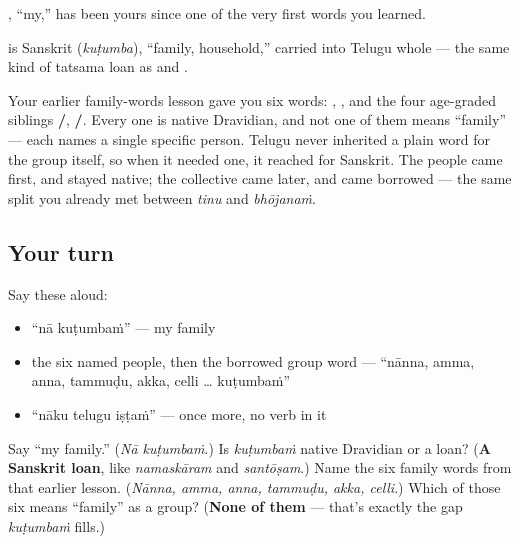 \textbf{}, \textquotedblleft{}my,\textquotedblright{} has been yours since one of the very first words you learned.

\begin{cousinweb}
\textbf{} is Sanskrit \textbf{} (\emph{kuṭumba}), \textquotedblleft{}family, household,\textquotedblright{} carried into Telugu whole — the same kind of tatsama loan as \textbf{} and \textbf{}.

Your earlier family-words lesson gave you six words: \textbf{}, \textbf{}, and the four age-graded siblings \textbf{/}, \textbf{/}. Every one is native Dravidian, and not one of them means \textquotedblleft{}family\textquotedblright{} — each names a single specific person. Telugu never inherited a plain word for the group itself, so when it needed one, it reached for Sanskrit. The people came first, and stayed native; the collective came later, and came borrowed — the same split you already met between \emph{tinu} and \emph{bhōjanaṁ}.
\end{cousinweb}

\subsection*{Your turn}
Say these aloud:

\begin{itemize}
\raggedright
  \item \textquotedblleft{}nā kuṭumbaṁ\textquotedblright{} — my family
  \item the six named people, then the borrowed group word — \textquotedblleft{}nānna, amma, anna, tammuḍu, akka, celli … kuṭumbaṁ\textquotedblright{}
  \item \textquotedblleft{}nāku telugu iṣṭaṁ\textquotedblright{} — once more, no verb in it
\end{itemize}

\begin{tcolorbox}[breakable,colback=teal!4,colframe=teal!35!black,title={Before you move on}]
Say \textquotedblleft{}my family.\textquotedblright{} (\emph{Nā kuṭumbaṁ}.) Is \emph{kuṭumbaṁ} native Dravidian or a loan? (\textbf{A Sanskrit loan}, like \emph{namaskāram} and \emph{santōṣam}.) Name the six family words from that earlier lesson. (\emph{Nānna, amma, anna, tammuḍu, akka, celli}.) Which of those six means \textquotedblleft{}family\textquotedblright{} as a group? (\textbf{None of them} — that's exactly the gap \emph{kuṭumbaṁ} fills.)
\end{tcolorbox}
